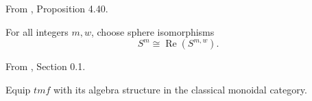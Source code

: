 \begin{definition}
\label{frontier:Literature:572b7f00f725}
From \cite{Pst}, Proposition 4.40.\par

For all integers $m,w$, choose sphere isomorphisms\[S^m\cong\operatorname{Re}(S^{m,w}).\]
\end{definition}

\begin{definition}
\label{frontier:Literature:5894b2586cbc}
From \cite{BR21}, Section 0.1.\par

Equip $\mathit{tmf}$ with its algebra structure in the classical monoidal category.
\end{definition}


